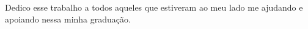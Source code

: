 Dedico esse trabalho a todos aqueles que estiveram ao meu lado me ajudando e apoiando nessa minha graduação.